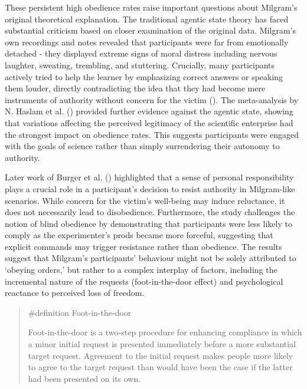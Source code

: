 \documentclass[
  letterpaper,
]{book}
\begin{document}
These persistent high obedience rates raise important questions about
Milgram's original theoretical explanation. The traditional agentic
state theory has faced substantial criticism based on closer examination
of the original data. Milgram's own recordings and notes revealed that
participants were far from emotionally detached - they displayed extreme
signs of moral distress including nervous laughter, sweating, trembling,
and stuttering. Crucially, many participants actively tried to help the
learner by emphasizing correct answers or speaking them louder, directly
contradicting the idea that they had become mere instruments of
authority without concern for the victim
(). The meta-analysis by N. Haslam et al.
() provided further
evidence against the agentic state, showing that variations affecting
the perceived legitimacy of the scientific enterprise had the strongest
impact on obedience rates. This suggests participants were engaged with
the goals of science rather than simply surrendering their autonomy to
authority.

Later work of Burger et al. ()
highlighted that a sense of personal responsibility plays a crucial role
in a participant's decision to resist authority in Milgram-like
scenarios. While concern for the victim's well-being may induce
reluctance, it does not necessarily lead to disobedience. Furthermore,
the study challenges the notion of blind obedience by demonstrating that
participants were less likely to comply as the experimenter's prods
became more forceful, suggesting that explicit commands may trigger
resistance rather than obedience. The results suggest that Milgram's
participants' behaviour might not be solely attributed to `obeying
orders,' but rather to a complex interplay of factors, including the
incremental nature of the requests (foot-in-the-door effect) and
psychological reactance to perceived loss of freedom.

\begin{quote}
\label{def-footinthedoor}{\#definition} Foot-in-the-door

Foot-in-the-door is a two-step procedure for enhancing compliance in
which a minor initial request is presented immediately before a more
substantial target request. Agreement to the initial request makes
people more likely to agree to the target request than would have been
the case if the latter had been presented on its own.
\end{quote}
\end{document}
